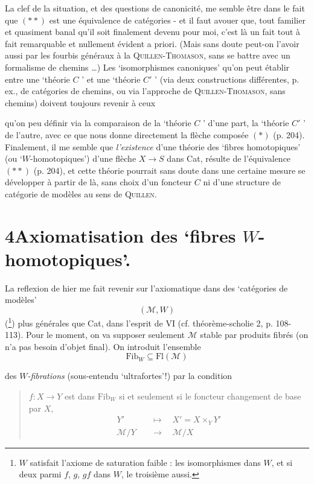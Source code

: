 \documentclass[11pt]{article}
\newcommand{\msp}[1]{\marginpar{\footnotesize [#1]}}
\begin{document}
\marginpar{$\|$}%
La clef de la situation, et des questions de canonicité, me semble être dans le fait que $(**)$ est une équivalence de catégories - et il faut avouer que, tout familier et quasiment banal qu'il soit finalement devenu pour moi, c'est là un fait tout à fait remarquable et nullement évident a priori. (Mais sans doute peut-on l'avoir aussi par les fourbis généraux à la \textsc{Quillen-Thomason}, sans se battre avec un formalisme de chemins \dots) Les ‘isomorphismes canoniques’ qu'on peut établir entre une ‘théorie $C$ ’ et une ‘théorie $C'$ ’ (via deux constructions différentes, p. ex., de catégories de chemins, ou via l'approche de \textsc{Quillen-Thomason}, sans chemins) doivent toujours revenir à ceux

\msp{page 207}qu'on peu définir via la comparaison de la ‘théorie $C$ ’ d'une part, la ‘théorie $C'$ ’ de l'autre, avec ce que nous donne directement la flèche composée $(*)$ (p. 204). Finalement, il me semble que \textit{l'existence} d'une théorie des ‘fibres homotopiques’ (ou ‘$W$-homotopiques’) d'une flèche $X \longrightarrow S$ dans Cat, résulte de l'équivalence $(**)$ (p. 204), et cette théorie pourrait sans doute dans une certaine mesure se développer à partir de là, sans choix d'un foncteur $C$ ni d'une structure de catégorie de modèles au sens de \textsc{Quillen}. %

\section*{4\quad Axiomatisation des ‘fibres $W$-homotopiques’.}

La reflexion de hier me fait revenir sur l'axiomatique dans des ‘catégories de modèles’ %
\[
(\mathcal{M}, W)
\]
(\footnote[119]{$W$ satisfait l'axiome de saturation faible : les isomorphismes dans $W$, et si deux parmi $f$, $g$, $gf$ dans $W$, le troisième aussi.}) plus générales que Cat, dans l'esprit de VI (cf. théorème-scholie 2, p. 108-113). Pour le moment, on va supposer seulement $\mathcal{M}$ stable par produits fibrés (on n'a pas besoin d'objet final). On introduit l'ensemble
\[
\mathrm{Fib}_W \subseteq \mathrm{Fl}(\mathcal{M})
\]

\msp{page 208}des \textit{$W$-fibrations} (sous-entendu ‘ultrafortes’!) par la condition

\begin{quote}
$f : X \longrightarrow Y$ est dans $\mathrm{Fib}_W$ si et seulement si le foncteur changement de base par $X$,
\[
\begin{aligned}
Y' &\quad\longmapsto\quad X' = X \times_Y Y' \\
\mathcal{M}/Y &\quad\longrightarrow\quad \mathcal{M}/X
\end{aligned}
\]
\end{quote}
\end{document}

